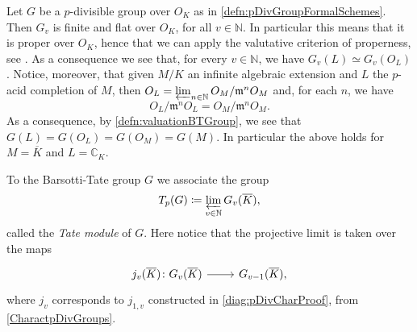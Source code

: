 \begin{rem}[]\label{VCPBTGroups}
	Let $G$ be a $p$-divisible group over $O_K$ as in \cref{defn:pDivGroupFormalSchemes}.
	Then $G_v$ is finite and flat over $O_K$, for all $v \in \mathbb{N}$. 
	In particular this means that it is proper over $O_K$, hence
	that we can apply the valutative criterion of properness,
	see \cite[Chapter II, theorem 4.7]{Hartshorne}.
	As a consequence we see that, for every $v \in \mathbb{N}$, we have
	$G_v(L) \simeq G_v(O_L)$.
	Notice, moreover, that given $M/K$ an infinite algebraic extension
	and $L$ the $p$-acid completion of $M$, then
	$O_L = \varprojlim_{n \in \mathbb{N}}O_M/\mathfrak{m}^nO_M$
	and, for each $n$, we have
	\begin{equation*}
	O_L/\mathfrak{m}^nO_L = O_M/\mathfrak{m}^nO_M
	.\end{equation*}
	As a consequence, by \cref{defn:valuationBTGroup}, we see that
	$G(L) = G(O_L) = G(O_M) = G(M)$.
	In particular the above holds for $M = \overline{K}$ and $L = \mathbb{C}_K$.
\end{rem}


\begin{defn}
	To the Barsotti-Tate group $G$ we associate the group
	\begin{equation*}
		T_p(G) \coloneqq \varprojlim_{v \in \mathbb{N}} G_v(\overline{K})
	,\end{equation*}
	called the {\em Tate module} of $G$.
	Here notice that the projective limit is taken over the maps
	\begin{equation*}
	\begin{tikzcd}[row sep = 0ex
		,/tikz/column 1/.append style={anchor=base east}
		,/tikz/column 2/.append style={anchor=base west}]
		j_v(\overline{K})\colon 
		G_v(\overline{K})\arrow[r, "", rightarrow] &
		G_{v-1}(\overline{K})
	,\end{tikzcd}
	\end{equation*} 
	where $j_v$ corresponds to $j_{1,v}$ constructed in
	\cref{diag:pDivCharProof}, from \cref{CharactpDivGroups}.
\end{defn}


